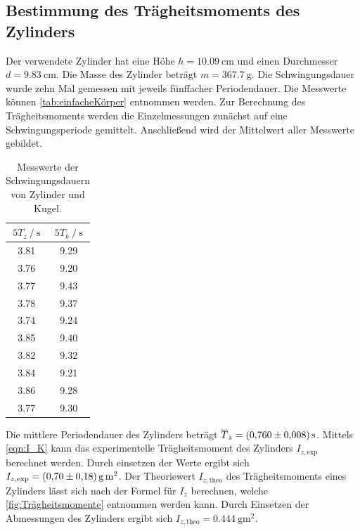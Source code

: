 \subsection{Bestimmung des Trägheitsmoments des Zylinders}
\label{subsec:A_zylinder}
Der verwendete Zylinder hat eine Höhe $h = \qty{10.09}{\centi\metre}$ und einen Durchmesser $d = \qty{9.83}{\centi\metre}$. Die Masse des Zylinder beträgt $m = \qty{367.7}{\gram}$.
Die Schwingungsdauer wurde zehn Mal gemessen mit jeweils fünffacher Periodendauer. Die Messwerte können \autoref{tab:einfacheKörper} entnommen werden. 
Zur Berechnung des Trägheitsmoments werden die Einzelmessungen zunächst auf eine Schwingungsperiode gemittelt. Anschließend wird der Mittelwert aller Messwerte gebildet.
\begin{table}
    \centering
    \caption{Messwerte der Schwingungsdauern von Zylinder und Kugel.} 
    \label{tab:einfacheKörper}
    \begin{tabular}{c c}
        \toprule
        ${5}T_{z} \mathbin{/} \unit{\second}$ & ${5}T_k \mathbin{/} \unit{\second}$ \\
        \midrule
        3.81 & 9.29 \\
        3.76 & 9.20 \\
        3.77 & 9.43 \\
        3.78 & 9.37 \\
        3.74 & 9.24 \\
        3.85 & 9.40 \\
        3.82 & 9.32 \\
        3.84 & 9.21 \\
        3.86 & 9.28 \\
        3.77 & 9.30 \\
        \bottomrule 
    \end{tabular}
\end{table}
Die mittlere Periodendauer des Zylinders beträgt $\overline{T}_z = \qty{0.760+-0.008}{\second}$.
Mittels \autoref{eqn:I_K} kann das experimentelle Trägheitsmoment des Zylinders $I_{z,\text{exp}}$ berechnet werden. Durch einsetzen der Werte ergibt sich $I_{z,\text{exp}} = \qty{0.70+-0.18}{\gram\metre\squared}$.
Der Theoriewert $I_{z,\text{theo}}$ des Trägheitsmoments eines Zylinders lässt sich nach der Formel für $I_z$ berechnen, welche \autoref{fig:Trägheitsmomente} entnommen werden kann.
Durch Einsetzen der Abmessungen des Zylinders ergibt sich $I_{z,\text{theo}} = \qty{0.444}{\gram\metre\squared}$.

